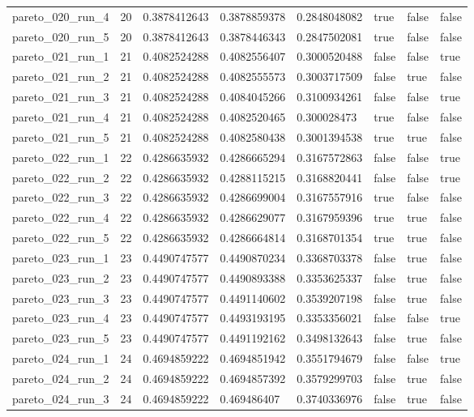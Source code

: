 \begin{tabular}{@{}llllllll@{}}
pareto\_020\_run\_4 & 20 & 0.3878412643 & 0.3878859378 & 0.2848048082 & true & false & false \\
pareto\_020\_run\_5 & 20 & 0.3878412643 & 0.3878446343 & 0.2847502081 & true & false & false \\
pareto\_021\_run\_1 & 21 & 0.4082524288 & 0.4082556407 & 0.3000520488 & false & false & true \\
pareto\_021\_run\_2 & 21 & 0.4082524288 & 0.4082555573 & 0.3003717509 & false & true & false \\
pareto\_021\_run\_3 & 21 & 0.4082524288 & 0.4084045266 & 0.3100934261 & false & false & true \\
pareto\_021\_run\_4 & 21 & 0.4082524288 & 0.4082520465 & 0.300028473 & true & false & false \\
pareto\_021\_run\_5 & 21 & 0.4082524288 & 0.4082580438 & 0.3001394538 & true & true & false \\
pareto\_022\_run\_1 & 22 & 0.4286635932 & 0.4286665294 & 0.3167572863 & false & false & true \\
pareto\_022\_run\_2 & 22 & 0.4286635932 & 0.4288115215 & 0.3168820441 & false & false & true \\
pareto\_022\_run\_3 & 22 & 0.4286635932 & 0.4286699004 & 0.3167557916 & true & false & false \\
pareto\_022\_run\_4 & 22 & 0.4286635932 & 0.4286629077 & 0.3167959396 & true & true & false \\
pareto\_022\_run\_5 & 22 & 0.4286635932 & 0.4286664814 & 0.3168701354 & true & true & false \\
pareto\_023\_run\_1 & 23 & 0.4490747577 & 0.4490870234 & 0.3368703378 & false & true & false \\
pareto\_023\_run\_2 & 23 & 0.4490747577 & 0.4490893388 & 0.3353625337 & false & true & false \\
pareto\_023\_run\_3 & 23 & 0.4490747577 & 0.4491140602 & 0.3539207198 & false & true & false \\
pareto\_023\_run\_4 & 23 & 0.4490747577 & 0.4493193195 & 0.3353356021 & false & false & true \\
pareto\_023\_run\_5 & 23 & 0.4490747577 & 0.4491192162 & 0.3498132643 & false & true & false \\
pareto\_024\_run\_1 & 24 & 0.4694859222 & 0.4694851942 & 0.3551794679 & false & false & true \\
pareto\_024\_run\_2 & 24 & 0.4694859222 & 0.4694857392 & 0.3579299703 & false & true & false \\
pareto\_024\_run\_3 & 24 & 0.4694859222 & 0.469486407 & 0.3740336976 & false & true & false \\

\end{tabular}
